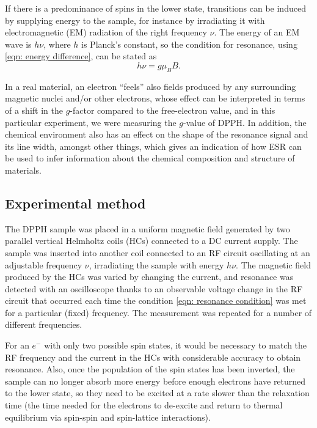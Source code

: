 \documentclass[a4paper]{jpconf}
\numberwithin{equation}{section}
\begin{document}
If there is a predominance of spins in the lower state, transitions can be induced by supplying energy to the sample, for instance by irradiating it with electromagnetic (EM) radiation of the right frequency $\nu$. The energy of an EM wave is $h \nu$, where $h$ is Planck's constant, so the condition for resonance, using \eqref{eqn: energy difference}, can be stated as
\begin{equation}
	h\nu = g\mu_B B. \label{eqn: resonance condition}
\end{equation}

In a real material, an electron ``feels'' also fields produced by any surrounding magnetic nuclei and/or other electrons, whose effect can be interpreted in terms of a shift in the $g$-factor compared to the free-electron value, and in this particular experiment, we were measuring the $g$-value of DPPH. In addition, the chemical environment also has an effect on the shape of the resonance signal and its line width, amongst other things, which gives an indication of how ESR can be used to infer information about the chemical composition and structure of materials. 

\subsection{Experimental method}\label{section: method}
The DPPH sample was placed in a uniform magnetic field generated by two parallel vertical Helmholtz coils (HCs) connected to a DC current supply. The sample was inserted into another coil connected to an RF circuit oscillating at an adjustable frequency $\nu$, irradiating the sample with energy $h\nu$. The magnetic field produced by the HCs was varied by changing the current, and resonance was detected with an oscilloscope thanks to an observable voltage change in the RF circuit that occurred each time the condition \eqref{eqn: resonance condition} was met for a particular (fixed) frequency. The measurement was repeated for a number of different frequencies.  

For an $e^-$ with only two possible spin states, it would be necessary to match the RF frequency and the current in the HCs with considerable accuracy to obtain resonance. Also, once the population of the spin states has been inverted, the sample can no longer absorb more energy before enough electrons have returned to the lower state, so they need to be excited at a rate slower than the relaxation time (the time needed for the electrons to de-excite and return to thermal equilibrium via spin-spin and spin-lattice interactions). 
\end{document}
